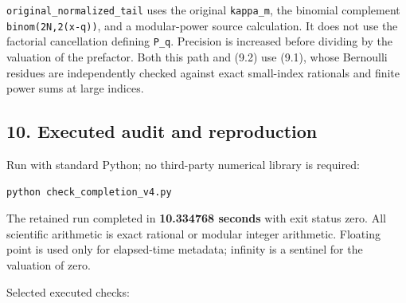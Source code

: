 \documentclass[11pt,letterpaper]{article}
\begin{document}
\texttt{original\_normalized\_tail} uses the original \texttt{kappa\_m}, the binomial complement \texttt{binom(2N,2(x-q))}, and a modular-power source calculation. It does not use the factorial cancellation defining \texttt{P\_q}. Precision is increased before dividing by the valuation of the prefactor. Both this path and (9.2) use (9.1), whose Bernoulli residues are independently checked against exact small-index rationals and finite power sums at large indices.

\subsection{10. Executed audit and reproduction}\label{executed-audit-and-reproduction}

Run with standard Python; no third-party numerical library is required:

\begin{verbatim}
python check_completion_v4.py
\end{verbatim}

The retained run completed in \textbf{10.334768 seconds} with exit status zero. All scientific arithmetic is exact rational or modular integer arithmetic. Floating point is used only for elapsed-time metadata; infinity is a sentinel for the valuation of zero.

Selected executed checks:
\end{document}
